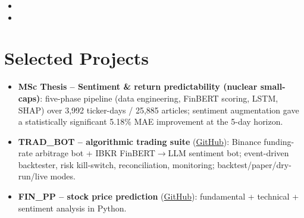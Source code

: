 \documentclass[11pt,a4paper,sans]{moderncv}
\begin{document}
\begin{itemize}
\vspace{3pt}

\item{}

\vspace{3pt}

\item{}

\end{itemize}


\section{Selected Projects}
\vspace{1pt}
\begin{itemize}
\item \textbf{MSc Thesis -- Sentiment \& return predictability (nuclear small-caps)}: five-phase pipeline (data engineering, FinBERT scoring, LSTM, SHAP) over 3,992 ticker-days / 25,885 articles; sentiment augmentation gave a statistically significant 5.18\% MAE improvement at the 5-day horizon.
\item \textbf{TRAD\_BOT -- algorithmic trading suite} (\href{https://github.com/McJack3d/TRAD_BOT}{GitHub}): Binance funding-rate arbitrage bot + IBKR FinBERT$\rightarrow$LLM sentiment bot; event-driven backtester, risk kill-switch, reconciliation, monitoring; backtest/paper/dry-run/live modes.
\item \textbf{FIN\_PP -- stock price prediction} (\href{https://github.com/McJack3d/FIN_PP}{GitHub}): fundamental + technical + sentiment analysis in Python.
\end{itemize}
\end{document}
